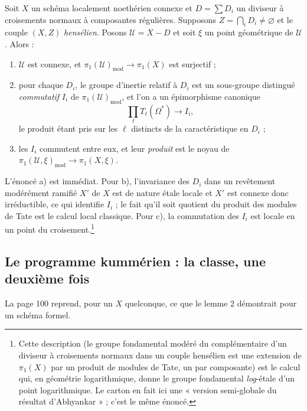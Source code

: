 \documentclass[11pt,a4paper]{article}
\begin{document}
Soit $X$ un schéma localement noethérien connexe et $D = \sum D_{i}$ un
diviseur à croisements normaux à composantes régulières. Supposons
$Z = \bigcap_{i} D_{i} \neq \varnothing$ et le couple $(X, Z)$
\emph{hensélien}. Posons $\mathcal{U} = X - D$ et soit $\xi$ un point
géométrique de $\mathcal{U}$. Alors :

\begin{enumerate}
  \item[a)] $\mathcal{U}$ est connexe, et
    $\pi_{1}(\mathcal{U})_{\mathrm{mod}} \to \pi_{1}(X)$ est surjectif ;
  \item[b)] pour chaque $D_{i}$, le groupe d'inertie relatif à $D_{i}$ est un
    sous-groupe distingué \emph{commutatif} $I_{i}$ de
    $\pi_{1}(\mathcal{U})_{\mathrm{mod}}$, et l'on a un épimorphisme canonique
    \[
      \prod_{\ell} T_{\ell}(\Omega^{*}) \longrightarrow I_{i} ,
    \]
    le produit étant pris sur les $\ell$ distincts de la caractéristique en
    $D_{i}$ ;
  \item[c)] les $I_{i}$ commutent entre eux, et leur \emph{produit} est le
    noyau de
    $\pi_{1}(\mathcal{U}, \xi)_{\mathrm{mod}} \to \pi_{1}(X, \xi)$.
\end{enumerate}

L'énoncé a) est immédiat. Pour b), l'invariance des $D_{i}$ dans un revêtement
modérément ramifié $X'$ de $X$ est de nature étale locale et $X'$ est connexe
donc irréductible, ce qui identifie $I_{i}$ ; le fait qu'il soit quotient du
produit des modules de Tate est le calcul local classique. Pour c), la
commutation des $I_{i}$ est locale en un point du
croisement.\footnote{Cette description (le groupe fondamental modéré du
complémentaire d'un diviseur à croisements normaux dans un couple hensélien
est une extension de $\pi_{1}(X)$ par un produit de modules de Tate, un par
composante) est le calcul qui, en géométrie logarithmique, donne le groupe
fondamental \emph{log}-étale d'un point logarithmique. Le carton en fait ici
une « version semi-globale du résultat d'Abhyankar » ; c'est le même énoncé.}

\subsection*{Le programme kummérien : la classe, une deuxième fois}

La page 100 reprend, pour un $X$ quelconque, ce que le lemme 2 démontrait pour
un schéma formel.
\end{document}
